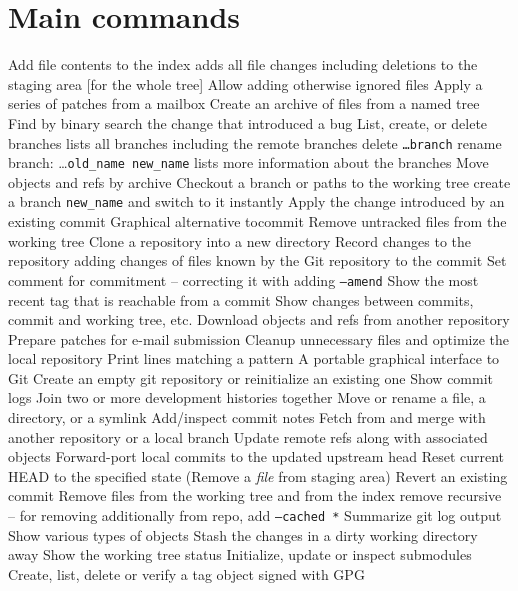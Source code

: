\section{Main commands}
	{Add file contents to the index}
	{adds all file changes including deletions to the staging area [for the whole tree]}
	{Allow adding otherwise ignored files}
	{Apply a series of patches from a mailbox}
	{Create an archive of files from a named tree}
	{Find by binary search the change that introduced a bug}
	{List, create, or delete branches}
	{lists all branches including the remote branches}
	{delete {\tt \dots branch}}
	{rename branch: \dots {\tt old\_name new\_name}}
	{lists more information about the branches}
	{Move objects and refs by archive}
	{Checkout a branch or paths to the working tree}
	{create a branch {\tt new\_name} and switch to it instantly}
	{Apply the change introduced by an existing commit}
	{Graphical alternative tocommit}
	{Remove untracked files from the working tree}
	{Clone a repository into a new directory}
	{Record changes to the repository}
	{adding changes of files known by the Git repository to the commit}
	{Set comment for commitment -- correcting it with adding {\tt --amend}}
	{Show the most recent tag that is reachable from a commit}
	{Show changes between commits, commit and working tree, etc.}
	{Download objects and refs from another repository}
	{Prepare patches for e-mail submission}
	{Cleanup unnecessary files and optimize the local repository}
	{Print lines matching a pattern}
	{A portable graphical interface to Git}
	{Create an empty git repository or reinitialize an existing one}
	{Show commit logs}
	{Join two or more development histories together}
	{Move or rename a file, a directory, or a symlink}
	{Add/inspect commit notes}
	{Fetch from and merge with another re\-pository or a local branch}
	{Update remote refs along with associated objects}
	{Forward-port local commits to the updated upstream head}
	{Reset current HEAD to the specified state (Remove a {\it file} from
staging area)}
	{Revert an existing commit}
	{Remove files from the working tree and from the index}
	{remove recursive -- for removing additionally from repo, add
{\tt --cached *}}
	{Summarize git log output}
	{Show various types of objects}
	{Stash the changes in a dirty working directory away}
	{Show the working tree status}
	{Initialize, update or inspect submodules}
	{Create, list, delete or verify a tag object signed with GPG}

